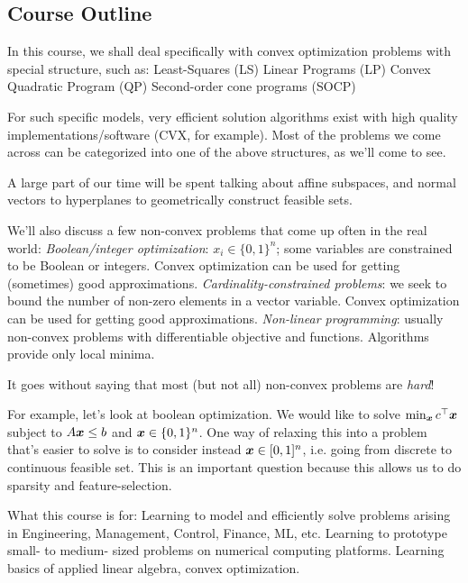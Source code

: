\documentclass[11 pt]{scrartcl}
\begin{document}
\subsection{Course Outline}

In this course, we shall deal specifically with convex optimization problems with special structure, such as: 
\itemnum
    \ii Least-Squares (LS)
    \ii Linear Programs (LP)
    \ii Convex Quadratic Program (QP)
    \ii Second-order cone programs (SOCP)
\itemend

For such specific models, very efficient solution algorithms exist with high quality implementations/software (CVX, for example). 
Most of the problems we come across can be categorized into one of the above structures, as we'll come to see. 

A large part of our time will be spent talking about affine subspaces, and normal vectors to hyperplanes to geometrically construct feasible sets. 

We'll also discuss a few non-convex problems that come up often in the real world: 
\itemnum
    \ii \emph{Boolean/integer optimization}: $x_i\in \{0,1\}^n$; some variables are constrained to be Boolean or integers. Convex optimization can be used for getting (sometimes) good approximations. 
    \ii \emph{Cardinality-constrained problems}: we seek to bound the number of non-zero elements in a vector variable. Convex optimization can be used for getting good approximations. 
    \ii \emph{Non-linear programming}: usually non-convex problems with differentiable objective and functions. Algorithms provide only local minima. 
\itemend

It goes without saying that most (but not all) non-convex problems are \emph{hard}!

For example, let's look at boolean optimization. We would like to solve $\min_{{\bm{x}}} c^\top {\bm{x}}$ subject to $A{\bm{x}} \leq b$ and ${\bm{x}}\in \{0,1\}^n$. 
One way of relaxing this into a problem that's easier to solve is to consider instead ${\bm{x}} \in [0,1]^n$, i.e. going from discrete to continuous feasible set.
This is an important question because this allows us to do sparsity and feature-selection. 

What this course is for: 
\itemnum
    \ii Learning to model and efficiently solve problems arising in Engineering, Management, Control, Finance, ML, etc. 
    \ii Learning to prototype small- to medium- sized problems on numerical computing platforms. 
    \ii Learning basics of applied linear algebra, convex optimization.
\itemend
\end{document}
